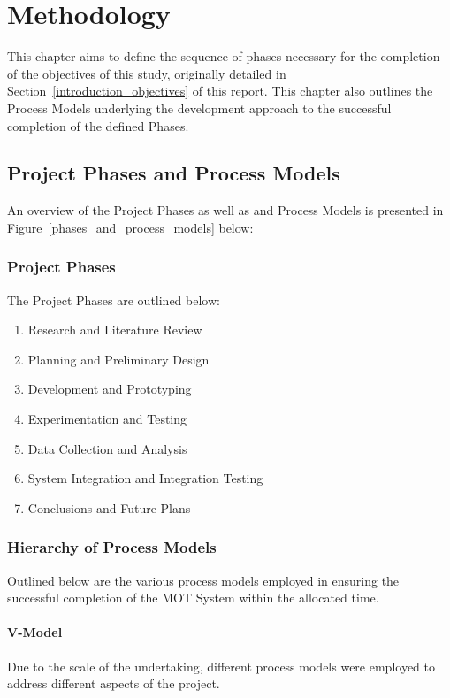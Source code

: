 \chapter{Methodology}\label{methodology}
This chapter aims to define the sequence of phases necessary for the completion
of the objectives of this study, originally detailed in Section~\ref{introduction_objectives} of this report.
This chapter also outlines the Process Models underlying the development
approach to the successful completion of the defined Phases.

\section{Project Phases and Process Models}
An overview of the Project Phases as well as and Process Models is presented in
Figure~\ref{phases_and_process_models} below:

\subsection{Project Phases}
The Project Phases are outlined below:
\begin{enumerate}
    \item Research and Literature Review
    \item Planning and Preliminary Design
    \item Development and Prototyping 
    \item Experimentation and Testing
    \item Data Collection and Analysis
    \item System Integration and Integration Testing
    \item Conclusions and Future Plans
\end{enumerate}

\subsection{Hierarchy of Process Models}
Outlined below are the various process models employed in ensuring the
successful completion of the MOT System within the allocated time.

\subsubsection{V-Model}
Due to the scale of the undertaking, different process models were employed to
address different aspects of the project.

